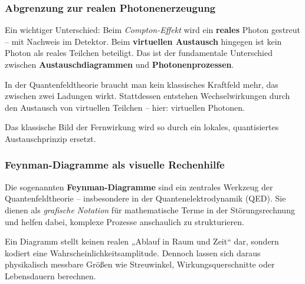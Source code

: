 \subsubsection*{Abgrenzung zur realen Photonenerzeugung}
Ein wichtiger Unterschied: Beim \emph{Compton-Effekt} wird ein \textbf{reales} Photon gestreut – mit Nachweis im Detektor. Beim \textbf{virtuellen Austausch} hingegen ist kein Photon als reales Teilchen beteiligt. Das ist der fundamentale Unterschied zwischen \textbf{Austauschdiagrammen} und \textbf{Photonenprozessen}.

\vspace{1em}

\begin{tcolorbox}[didaktikbox, title=Keine „unsichtbare Kraft“ mehr nötig]
	\label{box:unsichtbare Kraft}
	In der Quantenfeldtheorie braucht man kein klassisches Kraftfeld mehr, das zwischen zwei Ladungen wirkt. Stattdessen entstehen Wechselwirkungen durch den Austausch von virtuellen Teilchen – hier: virtuellen Photonen.
	
	Das klassische Bild der Fernwirkung wird so durch ein lokales, quantisiertes Austauschprinzip ersetzt.
\end{tcolorbox}

\subsubsection{Feynman-Diagramme als visuelle Rechenhilfe}

Die sogenannten \textbf{Feynman-Diagramme} sind ein zentrales Werkzeug der Quantenfeldtheorie – insbesondere in der Quantenelektrodynamik (QED). Sie dienen als \emph{grafische Notation} für mathematische Terme in der Störungsrechnung und helfen dabei, komplexe Prozesse anschaulich zu strukturieren.

Ein Diagramm stellt keinen realen „Ablauf in Raum und Zeit“ dar, sondern kodiert eine Wahrscheinlichkeitsamplitude. Dennoch lassen sich daraus physikalisch messbare Größen wie Streuwinkel, Wirkungsquerschnitte oder Lebensdauern berechnen.


